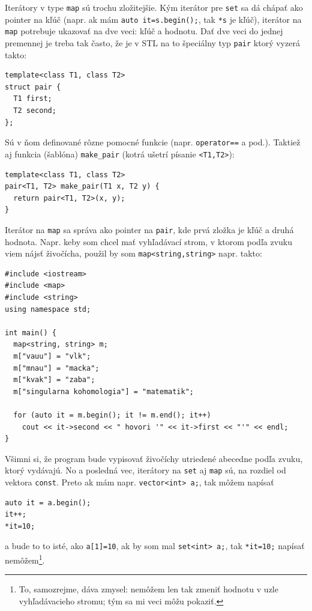 \documentclass[10pt]{article}
\def\prg{\lstinline}
\def\ods{\vspace*{10pt}}
\begin{document}
{\ods 
 Iterátory v type \prg!map! sú trochu zložitejšie. Kým iterátor pre \prg!set! sa dá
 chápať ako pointer na kľúč (napr. ak mám \prg!auto it=s.begin();!, tak \prg!*s! je 
 kľúč), iterátor na \prg!map! potrebuje ukazovať na dve veci: kľúč a hodnotu. Dať dve veci
 do jednej premennej je treba tak často, že je v STL na to špeciálny typ \prg!pair!
 ktorý vyzerá takto:

\begin{lstlisting}
template<class T1, class T2>
struct pair {
  T1 first;
  T2 second;
};
\end{lstlisting}

Sú v ňom definované rôzne pomocné funkcie (napr. \prg!operator==! a pod.). Taktiež
aj funkcia (šablóna) \prg!make_pair! (kotrá ušetrí písanie \prg!<T1,T2>!):

\begin{lstlisting}
template<class T1, class T2>
pair<T1, T2> make_pair(T1 x, T2 y) { 
  return pair<T1, T2>(x, y); 
}
\end{lstlisting}

Iterátor na \prg!map! sa správa ako pointer na \prg!pair!, kde prvá zložka je
kľúč a druhá hodnota. Napr. keby som chcel mať vyhľadávací strom, v ktorom
podľa zvuku viem nájsť živočícha, použil by som \prg!map<string,string>! napr.
takto:

\begin{lstlisting}
#include <iostream>
#include <map>
#include <string>
using namespace std;

int main() {
  map<string, string> m;
  m["vauu"] = "vlk";
  m["mnau"] = "macka";
  m["kvak"] = "zaba";
  m["singularna kohomologia"] = "matematik";

  for (auto it = m.begin(); it != m.end(); it++)
    cout << it->second << " hovori '" << it->first << "'" << endl;
}
\end{lstlisting}

Všimni si, že program bude vypisovať živočíchy utriedené abecedne podľa zvuku, ktorý vydávajú.
No a posledná vec, iterátory na \prg!set! aj \prg!map! sú, na rozdiel od vektora \prg!const!.
Preto ak mám napr. \prg!vector<int> a;!, tak môžem napísať

\begin{lstlisting}
auto it = a.begin();
it++;
*it=10;
\end{lstlisting}

a bude to to isté, ako \prg!a[1]=10!, ak by som mal \prg!set<int> a;!, tak 
\prg!*it=10;! napísať 
nemôžem\footnote{To, samozrejme, dáva zmysel: nemôžem len tak zmeniť hodnotu v 
uzle vyhľadávacieho stromu; tým sa mi veci môžu pokaziť.}.

}
\end{document}

